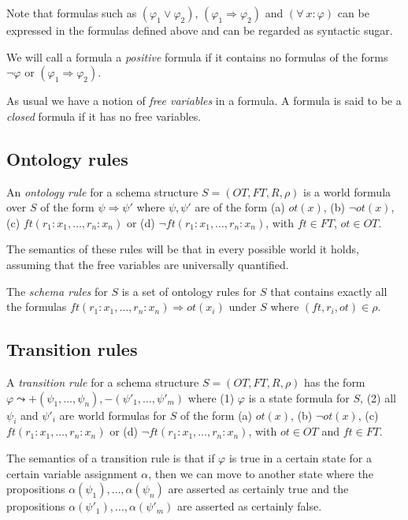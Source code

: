 \documentclass[11pt]{amsart}
\begin{document}
Note that formulas such as $(\varphi_1 \vee \varphi_2)$, $(\varphi_1 \Rightarrow \varphi_2)$ and $(\forall\  x : \varphi)$ can be expressed in the formulas defined above and can be regarded as syntactic sugar.

We will call a formula a \emph{positive} formula if it contains no formulas of the forms $\neg\varphi$ or $(\varphi_1 \Rightarrow \varphi_2)$.

As usual we have a notion of \emph{free variables} in a formula. A formula is said to be a \emph{closed} formula if it has no free variables.


\subsection{Ontology rules} An \emph{ontology rule} for a schema structure $S = (OT, FT, R, \rho)$ is a world formula over $S$ of the form  $\psi \Rightarrow \psi'$ where $\psi, \psi'$ are of the form (a) $ot(x)$, (b) $\neg ot(x)$, (c) $ft(r_1 : x_1, \ldots, r_n : x_n)$ or (d) $\neg {ft}(r_1 : x_1, \ldots, r_n : x_n)$, with $ft \in FT$, $ot \in {OT}$.

The semantics of these rules will be that in every possible world it holds, assuming that the free variables are universally quantified.

The \emph{schema rules} for $S$ is a set of ontology rules for $S$ that contains exactly all the formulas $ft(r_1 : x_1, \ldots, r_n : x_n) \Rightarrow ot(x_i)$ under $S$ where $(ft, r_i, ot) \in \rho$.

\subsection{Transition rules} A \emph{transition rule} for a schema structure $S = (OT, FT, R, \rho)$ has the form $\varphi \leadsto +(\psi_1, \ldots, \psi_n), -(\psi'_1, \ldots, \psi'_m)$ where (1) $\varphi$ is a state formula for $S$, (2) all $\psi_i$ and $\psi'_i$ are world formulas for $S$ of the form (a) $ot(x)$, (b) $\neg{ot}(x)$, (c) $ft(r_1:x_1, \ldots, r_n:x_n)$ or (d) $\neg{ft}(r_1:x_1, \ldots, r_n:x_n)$, with $ot \in {OT}$ and $ft \in {FT}$.

The semantics of a transition rule is that if $\varphi$ is true in a certain state for a certain variable assignment $\alpha$, then we can move to another state where the propositions $\alpha(\psi_1), \ldots, \alpha(\psi_n)$ are asserted as certainly true and the propositions $\alpha(\psi'_1), \ldots, \alpha(\psi'_m)$ are asserted as certainly false.
\end{document}

